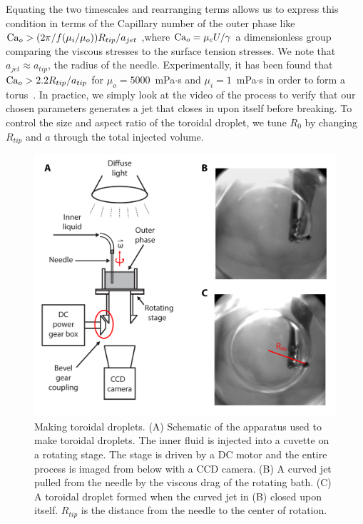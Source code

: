Equating the two timescales and rearranging terms allows us to express this condition in terms of the Capillary number of the outer phase like $\textup{Ca}_o > (2 \pi / f(\mu_i/\mu_o))R_{tip}/a_{jet}$ ,where $\textup{Ca}_o = \mu_c U/\gamma$ a dimensionless group comparing the viscous stresses to the surface tension stresses.
We note that $a_{jet} \approx a_{tip}$, the radius of the needle.
Experimentally, it has been found that $\textup{Ca}_o > 2.2 R_{tip}/a_{tip}$ for $\mu_o = 5000$~mPa$\cdot$s and $\mu_i = 1$~mPa$\cdot$s in order to form a torus~\cite{RN29}.
In practice, we simply look at the video of the process to verify that our chosen parameters generates a jet that closes in upon itself before breaking.
To control the size and aspect ratio of the toroidal droplet, we tune $R_0$ by changing $R_{tip}$ and $a$ through the total injected volume.
\begin{figure}
  \centering
  \includegraphics{figures/C3/Ch3-Figs_MakeTorus.png}
  \caption{Making toroidal droplets.
  (A) Schematic of the apparatus used to make toroidal droplets.
  The inner fluid is injected into a cuvette on a rotating stage.
  The stage is driven by a DC motor and the entire process is imaged from below with a CCD camera.
  (B) A curved jet pulled from the needle by the viscous drag of the rotating bath.
  (C) A toroidal droplet formed when the curved jet in (B) closed upon itself.
  $R_{tip}$ is the distance from the needle to the center of rotation.}\label{f:3-MakeTorus}
\end{figure}

